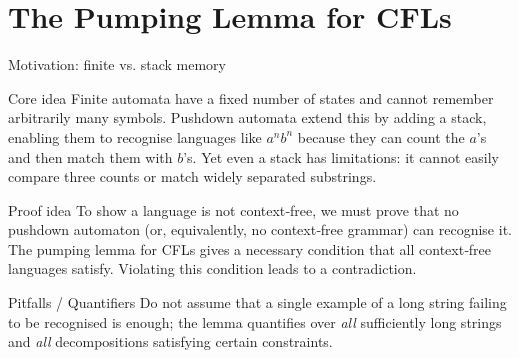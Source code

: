 %

\section{The Pumping Lemma for CFLs}

\begin{frame}[t]{Motivation: finite vs. stack memory}
  \begin{tblock}{Core idea}
    Finite automata have a fixed number of states and cannot remember
    arbitrarily many symbols.  Pushdown automata extend this by adding a
    stack, enabling them to recognise languages like $a^n b^n$ because
    they can count the $a$’s and then match them with $b$’s.  Yet even
    a stack has limitations: it cannot easily compare three counts or
    match widely separated substrings.
  \end{tblock}
  \begin{tblock}{Proof idea}
    To show a language is not context‑free, we must prove that no
    pushdown automaton (or, equivalently, no context‑free grammar) can
    recognise it.  The pumping lemma for CFLs gives a necessary
    condition that all context‑free languages satisfy.  Violating this
    condition leads to a contradiction.
  \end{tblock}
  \begin{talert}{Pitfalls / Quantifiers}
    Do not assume that a single example of a long string failing to be
    recognised is enough; the lemma quantifies over \emph{all}
    sufficiently long strings and \emph{all} decompositions satisfying
    certain constraints.
  \end{talert}
  \label{fr:6.1-01}
\end{frame}

